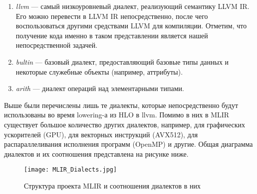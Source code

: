 \begin{enumerate}
    \item \textit{llvm} --- самый низкоуровневый диалект, реализующий семантику
          LLVM IR. Его можно перевести в LLVM IR непосредственно, после чего
          воспользоваться другими средствами LLVM для компиляции. Отметим, что
          получение кода именно в таком представлении является нашей
          непосредственной задачей.

    \item \textit{bultin} --- базовый диалект, предоставляющий базовые типы
          данных и некоторые служебные объекты (например, аттрибуты).

    \item \textit{arith} --- диалект операций над элементарными типами.
\end{enumerate}

Выше были перечислены лишь те диалекты, которые непосредственно будут
использованы во время lowering-а из HLO в llvm. Помимо в них в MLIR существует
большое количество других диалектов, например, для графических ускорителей (GPU),
для векторных инструкций (AVX512), для распараллеливания исполнения программ
(OpenMP) и другие. Общая диаграмма диалектов и их соотношения представлена на
рисунке ниже.

\begin{figure}[h!]
    \centering
    \texttt{[image: MLIR\_Dialects.jpg]}
    \caption{Структура проекта MLIR и соотношения диалектов в них}
\end{figure}
